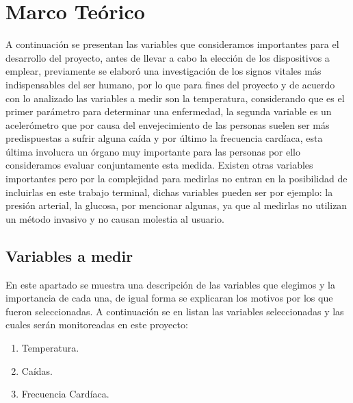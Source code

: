 \section{Marco Teórico}

A continuación se presentan las variables que consideramos importantes para el desarrollo del proyecto, antes de llevar a cabo la elección de los dispositivos a emplear, previamente se elaboró una investigación de los signos vitales más indispensables del ser humano, por lo que para fines del proyecto y de acuerdo con lo analizado las variables a medir son la temperatura, considerando que es el primer parámetro para determinar una enfermedad, la segunda variable es un acelerómetro que por causa del envejecimiento de las personas suelen ser más predispuestas a sufrir alguna caída y por último la frecuencia cardíaca, esta última involucra un órgano muy importante para las personas por ello consideramos evaluar conjuntamente esta medida. Existen otras variables importantes pero por la complejidad para medirlas no entran en la posibilidad de incluirlas en este trabajo terminal, dichas variables pueden ser por ejemplo: la presión arterial, la glucosa, por mencionar algunas, ya que al medirlas no utilizan un método invasivo y no causan molestia al usuario. \\

\subsection{Variables a medir}

En este apartado se muestra una descripción de las variables que elegimos y la importancia de cada una, de igual forma se explicaran los motivos por los que fueron seleccionadas. A continuación se en listan las variables seleccionadas y las cuales serán monitoreadas en este proyecto:

\begin{enumerate}
	\item Temperatura.
	\item Caídas.
	\item Frecuencia Cardíaca.
\end{enumerate}

